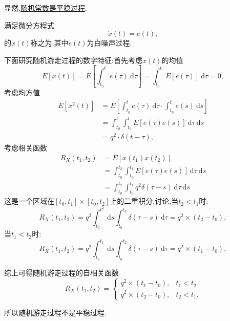 \documentclass[cn,10pt,citestyle=gb7714-2015,bibstyle=gb7714-2015]{elegantbook}
\newcommand{\md}{\ \mathrm{d}}
\begin{document}
显然,\uline{随机常数是平稳过程}.
\begin{definition}[随机游走过程]\label{def:random-walk-process}
  满足微分方程式
  \begin{equation}
    \dot{x}(t)=e(t),
  \end{equation}
  的$x(t)$称之为.其中$e(t)$为白噪声过程.
\end{definition}
下面研究随机游走过程的数字特征:首先考虑$x(t)$的均值
\[
    E[x(t)]=E\left[\int_{t_0}^te(\tau)\md\tau\right]=\int_{t_0}^tE[e(\tau)]\md\tau=0,
\]
考虑均方值
\begin{align*}
  E[x^2(t)]&=E\left[\int_{t_0}^te(\tau)\md\tau\cdot\int_{t_0}^te(s)\md s\right]\\
  &=\int_{t_0}^t\!\int_{t_0}^tE[e(\tau)e(s)]\md\tau\!\md s\\
  &=q^2\cdot\delta(t-\tau),
\end{align*}
考虑相关函数
\begin{align*}
  R_X(t_1,t_2)&=E[x(t_1)x(t_2)]\\
  &=\int_{t_0}^{t_2}\!\int_{t_0}^{t_1}E[e(\tau)e(s)]\md\tau\!\md s\\
  &=\int_{t_0}^{t_2}\!\int_{t_0}^{t_1}q^2\delta(\tau-s)\md\tau\!\md s
\end{align*}
这是一个区域在$[t_0,t_1]\times[t_0,t_2]$上的二重积分,讨论,当$t_2<t_1$时:
\[
    R_X(t_1,t_2)=q^2\int_{t_0}^{t^2}\md s\int_{t_0}^{t_1}\delta(\tau-s)\md\tau=q^2\times(t_2-t_0),
\]
当$t_1<t_2$时:
\[
    R_X(t_1,t_2)=q^2\int_{t_0}^{t_1}\md s\int_{t_0}^{t_2}\delta(\tau-s)\md\tau=q^2\times(t_1-t_0),
\]
\begin{conclusion}
综上可得随机游走过程的自相关函数
\[
    R_X(t_1,t_2)=\begin{cases}
      q^2\times(t_1-t_0),&t_1<t_2\\
      q^2\times(t_2-t_0),&t_2<t_1.
    \end{cases}
\]
\end{conclusion}
所以随机游走过程不是平稳过程.
\end{document}
